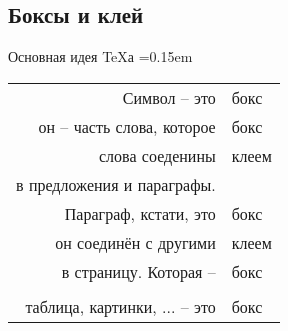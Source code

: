
\subsection{Боксы и клей}
\begin{frame}{Основная идея \TeX а}\relax
    \centering \large
    \tabcolsep=0.15em
    \begin{tabular}{r>{\ccsc}l}
         Символ -- это & бокс\\
         он -- часть слова, которое & бокс\\ 
         слова соеденины & клеем\\ 
         в предложения и параграфы.&\\ 
         Параграф, кстати, это & бокс\\
         он соединён с другими & клеем\\
         в страницу. Которая -- & бокс\\
         &\\ 
         таблица, картинки, ... -- это & бокс 
    \end{tabular}
    
\end{frame}


